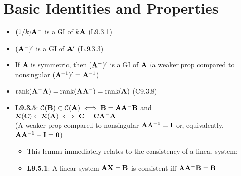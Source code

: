 \documentclass[a4paper, oneside]{book}
\begin{document}
\section*{Basic Identities and Properties}
\begin{itemize}
\item $(1/k)\mathbf{A}^-$ is a GI of $k\mathbf A$ (L9.3.1)
\item $(\mathbf A^-)'$ is a GI of $\mathbf A'$ (L.9.3.3)
\item If $\mathbf A$ is symmetric, then $(\mathbf{A}^-)'$ is a GI of $\mathbf A$ (a weaker prop compared to nonsingular $(\mathbf A^{-1})' = \mathbf A^{-1} $)
\item $\text{rank}(\mathbf{A^-A}) = \text{rank}(\mathbf{AA^-}) = \text{rank}(\mathbf A)$ (C9.3.8)
\item \textbf{L9.3.5}: $\mathcal{C}(\mathbf B)\subset \mathcal{C}( \mathbf A) \iff \mathbf{B=AA^-B}$ and $\mathcal{R}(\mathbf C)\subset \mathcal{R}( \mathbf A) \iff \mathbf{C=CA^-A}$ \\ (A weaker prop compared to nonsingular $\mathbf{AA^{-1}=I}$ or, equivalently, $\mathbf{AA^{-1}-I=0}$)
	\begin{itemize}
	\item This lemma immediately relates to the consistency of a linear system:
	\item \textbf{L9.5.1}: A linear system $\mathbf{AX=B}$ is consistent iff $\mathbf{AA^-B=B}$
	\end{itemize}
\end{itemize}
\end{document}
